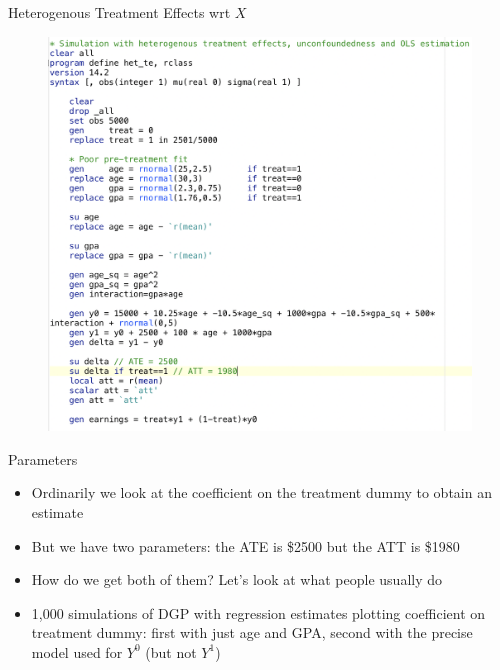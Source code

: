 \documentclass{beamer}
\begin{document}
\begin{frame}{Heterogenous Treatment Effects wrt $X$}

\begin{figure}[!t]\centering
\includegraphics[scale=0.27]{./lecture_includes/stata_matching_code}
\end{figure}

\end{frame}

\begin{frame}{Parameters}

\begin{itemize}

\item Ordinarily we look at the coefficient on the treatment dummy to obtain an estimate
\item But we have two parameters: the ATE is \$2500 but the ATT is \$1980
\item How do we get both of them? Let's look at what people usually do
\item 1,000 simulations of DGP with regression estimates plotting coefficient on treatment dummy: first with just age and GPA, second with the precise model used for $Y^0$ (but not $Y^1$)

\end{itemize}

\end{frame}
\end{document}
